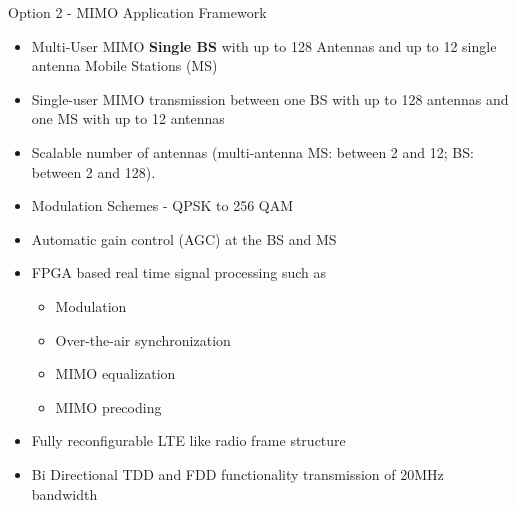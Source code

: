 \documentclass[10pt,t]{beamer}
\begin{document}
\begin{frame}{Option 2 - MIMO Application Framework}
    \begin{itemize}
        \item Multi-User MIMO \textbf{Single BS} with up to 128 Antennas and up to 12 single antenna Mobile Stations (MS)
        \item Single-user MIMO transmission between one BS with up to 128 antennas and one MS with up to 12 antennas
        \item Scalable number of antennas (multi-antenna MS: between 2 and 12; BS: between 2 and 128).%
        \item Modulation Schemes - QPSK to 256 QAM
        \item Automatic gain control (AGC) at the BS and MS
            \pause
        \item FPGA based real time signal processing such as 
            \begin{itemize}
                \item Modulation
                \item Over-the-air synchronization
                \item MIMO equalization
                \item MIMO precoding
            \end{itemize}
        \item Fully reconfigurable LTE like radio frame structure
        \item Bi Directional TDD and FDD functionality transmission of 20\si{\mega\hertz} bandwidth
    \end{itemize}
\end{frame}
\end{document}

